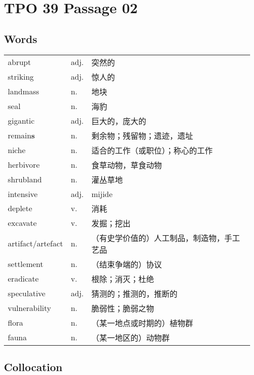 \section{TPO 39 Passage 02}

\subsection{Words}

\begin{tabular}{lll}
    abrupt            & adj. & 突然的                   \\
    striking          & adj. & 惊人的                   \\
    landmass          & n.   & 地块                    \\
    seal              & n.   & 海豹                    \\
    gigantic          & adj. & 巨大的，庞大的               \\
    remain\textbf{s}  & n.   & 剩余物；残留物；遗迹，遗址         \\
    niche             & n.   & 适合的工作（或职位）；称心的工作      \\
    herbivore         & n.   & 食草动物，草食动物             \\
    shrubland         & n.   & 灌丛草地                  \\
    intensive         & adj. & mijide                \\
    deplete           & v.   & 消耗                    \\
    excavate          & v.   & 发掘；挖出                 \\
    artifact/artefact & n.   & （有史学价值的）人工制品，制造物，手工艺品 \\
    settlement        & n.   & （结束争端的）协议             \\
    eradicate         & v.   & 根除；消灭；杜绝              \\
    speculative       & adj. & 猜测的；推测的，推断的           \\
    vulnerability     & n.   & 脆弱性；脆弱之物              \\
    flora             & n.   & （某一地点或时期的）植物群         \\
    fauna             & n.   & （某一地区的）动物群            \\
\end{tabular}

\subsection{Collocation}

